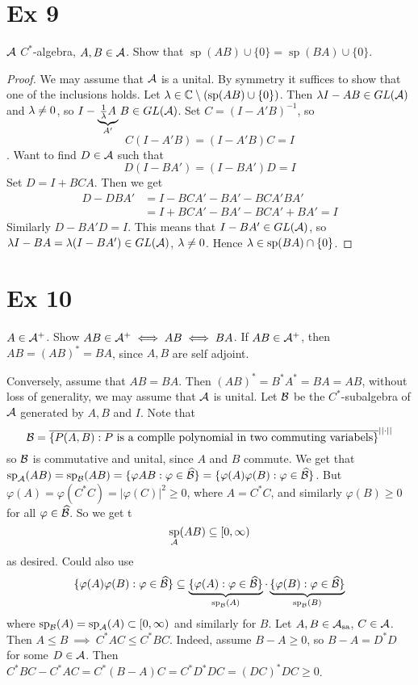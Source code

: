 \documentclass[10pt,english,a4paper]{article}
\theoremstyle{definition}
\def\Assa{\As_{\text{sa}}}
\DeclareMathOperator{\Sp}{sp}
\begin{document}
\section*{Ex 9}
$\mathcal{A}$ $C^*$-algebra, $A, B \in \mathcal{A}$. Show that $\Sp(AB) \cup \{0\} =
\Sp(BA)\cup \{0\}$.
\begin{proof}
    We may assume that $\mathcal{A}$ is a unital.
    By symmetry it suffices to show that one of the inclusions holds. 
    Let $\la \in \C \setminus (\Sp(AB)\cup \{0\})$. 
    Then $\lambda I -AB \in GL(\mathcal{A})$ and $\lambda \neq 0$, so
    $I-\underbrace{\tfrac{1}{\lambda}A}_{A'}B \in GL(\mathcal{A})$.  Set $C = (I-A'B)^{-1}$, so
    \[C(I-A'B) = (I-A'B)C = I\]. Want to find $D \in \mathcal{A}$ such that 
    \[D(I-BA') = (I-BA')D = I\]
    Set $D = I+BCA$. Then we get 
    \begin{align*}
        D-DBA' &= I-BCA' -BA' -BCA'BA' \\
        &= I+BCA' - BA' -BCA' +BA' = I
    \end{align*}
    Similarly $D-BA'D = I$. This means that $I-BA' \in GL(\mathcal{A})$, so
    $\lambda I - BA = \lambda(I-BA') \in GL(\mathcal{A})$, $\lambda  \neq 0$.
    Hence $\la \in \Sp(BA)\cap \{0\}$. 
     
\end{proof}

\section*{Ex 10}
$A \in \mathcal{A}^+$. Show $AB \in \mathcal{A}^+ \iff AB \iff BA$. If $AB \in \mathcal{A}^+$, 
then $AB = (AB)^* = BA$, since $A,B$ are self adjoint. 

Conversely, assume that $AB = BA$. Then $(AB)^* = B^*A^* = BA =AB$,
without loss of generality, we may assume that $\mathcal{A}$ is unital. 
Let $\mathcal{B}$ be the $C^*$-subalgebra of $\mathcal{A}$ generated by $A,B$ and $I$.
Note that 
\[
\mathcal{B} = \overline{\{ P(A,B) : P \text{ is a complle polynomial in two commuting variabels}\}}^{||\cdot||}
\]
so $\mathcal{B}$ is commutative and unital, since $A$ and $B$ commute.
We get that 
$\Sp_{\As}(AB) = \Sp_{\Bs}(AB) = \{\varphi{AB} : \varphi \in \widehat{\Bs}\}
= \{ \varphi(A)\varphi(B) : \varphi \in \widehat{\Bs} \}$. 
But $\varphi(A) = \varphi(C^*C) = |\varphi(C)|^2 \geq 0$, where $A = C^*C$, 
and similarly $\varphi(B) \geq 0$ for all $\varphi \in \widehat{\mathcal{B}}$.
So we get t 
\[ \Sp_{\As}(AB) \subseteq [0,\infty) \]
as desired. 
Could also use 
\begin{align*}
   \{ \varphi(A)\varphi(B) :\varphi \in \widehat{\Bs} \} 
    &\subseteq \ub{\{ \varphi(A) :\varphi \in \widehat{\Bs} \}}_{\Sp_{\Bs}(A)} \cdot
    \ub{\{ \varphi(B) :\varphi \in \widehat{\Bs} \}}_{\Sp_{\Bs}(B)}  \\
\end{align*}
where $\Sp_{\Bs}(A) = \Sp_{\As}(A) \subset [0,\infty)$ and similarly for $B$.
Let $A,B \in \Assa$, $C \in \mathcal{A}$. Then $A \leq B~\implies ~ C^*AC \leq C^*BC$. 
Indeed, assume $B-A \geq 0$, so $B-A = D^*D$ for some $D \in \mathcal{A}$. 
Then $C^*BC - C^*AC = C^*(B-A)C = C^*D^*DC = (DC)^*DC \geq 0$.
\end{document}
